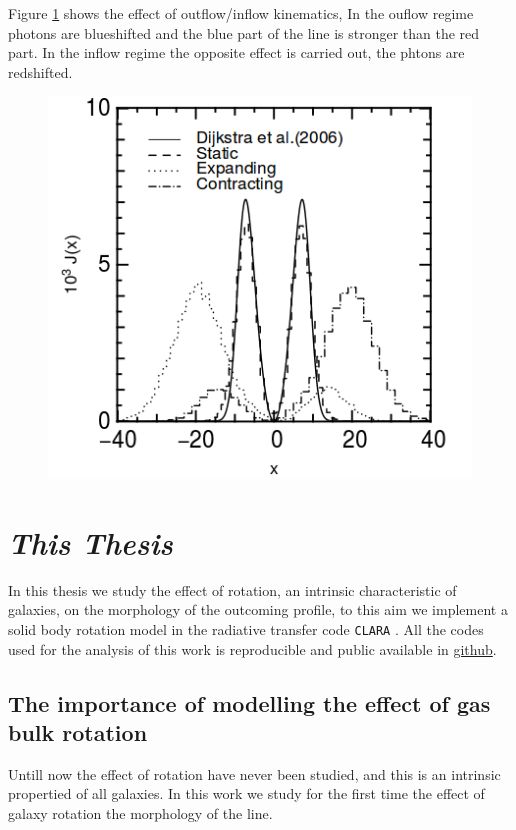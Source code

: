 Figure \ref{fig:out} shows the effect of outflow/inflow kinematics, 
In the ouflow regime photons are blueshifted and the blue part of the line
is stronger than the red part. In the inflow regime the opposite effect
is carried out, the \ly phtons are redshifted. 

\begin{figure}[H]\label{fig:out}
\begin{center}
\includegraphics[scale=0.4]{../Figures/out.png}
\end{center}
\end{figure}

\section{\emph{This Thesis}}

In this thesis we study the effect of rotation, an intrinsic
 characteristic of galaxies, on the morphology
of the \lya outcoming profile, to this aim we implement a solid body
rotation model in the radiative transfer code \verb+CLARA+ \citep{CLARA}.
All the codes used for the analysis of this work is reproducible
and public available in \href{https://github.com/jngaravitoc/RotationLyAlpha}{github}.

\subsection{The importance of modelling the effect of gas bulk rotation}

Untill now the effect of rotation have never been studied, and this is 
an intrinsic propertied of all galaxies. In this work we study for the 
first time the effect of galaxy rotation the morphology of the \ly line.

